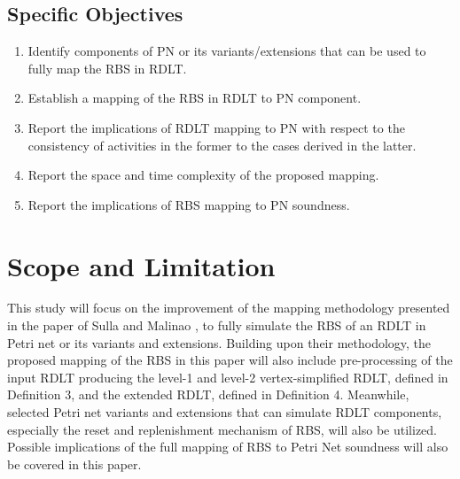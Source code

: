\documentclass[12pt]{article}
\begin{document}
    \subsection{Specific Objectives}
    \begin{enumerate}
        \item Identify components of PN or its variants/extensions that can be used to fully map the RBS in RDLT.
        \item Establish a mapping of the RBS in RDLT to PN component.
        \item Report the implications of RDLT mapping to PN with respect to the consistency of activities in the former to the cases derived in the latter.
        \item Report the space and time complexity of the proposed mapping.
        \item Report the implications of RBS mapping to PN soundness.
    \end{enumerate}

\section{Scope and Limitation}
This study will focus on the improvement of the mapping methodology presented in the paper of Sulla and Malinao \cite{sulla-malinao}, to fully simulate the RBS of an RDLT in Petri net or its variants and extensions. Building upon their methodology, the proposed mapping of the RBS in this paper will also include pre-processing of the input RDLT producing the level-1 and level-2 vertex-simplified RDLT, defined in Definition 3, and the extended RDLT, defined in Definition 4. Meanwhile, selected Petri net variants and extensions that can simulate RDLT components, especially the reset and replenishment mechanism of RBS, will also be utilized. Possible implications of the full mapping of RBS to Petri Net soundness will also be covered in this paper.

\end{document}
